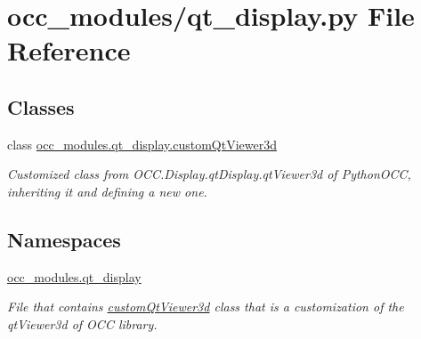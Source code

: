 \hypertarget{a00020}{}\section{occ\+\_\+modules/qt\+\_\+display.py File Reference}
\label{a00020}
\subsection*{Classes}
\begin{DoxyCompactItemize}
\item 
class \hyperlink{a00090}{occ\+\_\+modules.\+qt\+\_\+display.\+custom\+Qt\+Viewer3d}
\begin{DoxyCompactList}\small\item\em Customized class from O\+C\+C.\+Display.\+qt\+Display.\+qt\+Viewer3d of Python\+O\+CC, inheriting it and defining a new one. \end{DoxyCompactList}\end{DoxyCompactItemize}
\subsection*{Namespaces}
\begin{DoxyCompactItemize}
\item 
 \hyperlink{a00055}{occ\+\_\+modules.\+qt\+\_\+display}
\begin{DoxyCompactList}\small\item\em File that contains \hyperlink{a00090}{custom\+Qt\+Viewer3d} class that is a customization of the qt\+Viewer3d of O\+CC library. \end{DoxyCompactList}\end{DoxyCompactItemize}
